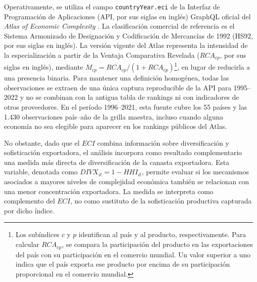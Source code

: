 \documentclass[../../TFM.tex]{subfiles}
\begin{document}
Operativamente, se utiliza el campo \texttt{countryYear.eci} de la Interfaz de
Programación de Aplicaciones (API, por sus siglas en inglés) GraphQL oficial del \textit{Atlas of Economic Complexity}
\parencite{HarvardGrowthLab2024}. La clasificación comercial de referencia es el Sistema Armonizado de Designación y Codificación de Mercancías de 1992 (HS92, por sus siglas en inglés). La versión vigente del Atlas representa la
intensidad de la especialización a partir de la Ventaja Comparativa Revelada
($RCA_{cp}$, por sus siglas en inglés), mediante
$M_{cp}=RCA_{cp}/(1+RCA_{cp})$\footnote{Los subíndices $c$ y $p$ identifican
al país y al producto, respectivamente. Para calcular $RCA_{cp}$, se compara la participación
del producto en las exportaciones del país con su participación en el comercio
mundial. Un valor superior a uno indica que el país exporta ese producto por
encima de su participación proporcional en el comercio mundial.}, en lugar de
reducirla a una presencia binaria.
Para mantener una definición homogénea, todas las observaciones se extraen de
una única captura reproducible de la API para 1995--2022 y no se combinan con
la antigua tabla de rankings ni con indicadores de otros proveedores. En el
período 1996--2021, esta fuente cubre los 55 países y las 1.430 observaciones
país--año de la grilla maestra, incluso cuando alguna economía no sea elegible
para aparecer en los rankings públicos del Atlas.

No obstante, dado que el $ECI$ combina información sobre diversificación y
sofisticación exportadora, el análisis incorpora como resultado
complementario una medida más directa de diversificación de la canasta
exportadora. Esta variable, denotada como $DIVX_{it}=1-HHI_{it}$, permite
evaluar si los mecanismos asociados a mayores niveles de complejidad
económica también se relacionan con una menor concentración exportadora.
La medida se interpreta como complemento del $ECI$, no como sustituto de la
sofisticación productiva capturada por dicho índice.
\end{document}
